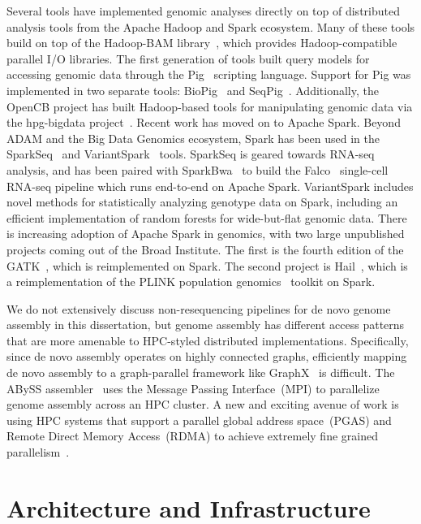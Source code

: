 \documentclass[phd]{ucbthesis}
\begin{document}
Several tools have implemented genomic analyses directly on top of distributed
analysis tools from the {Apache Hadoop} and {Spark} ecosystem.
Many of these tools build on top of the {Hadoop-BAM}
library~\cite{niemenmaa12}, which provides {Hadoop}-compatible parallel
I/O libraries. The first generation of tools built query models for accessing
genomic data through the {Pig}~\cite{olston08} scripting language.
Support for {Pig} was implemented in two separate tools: {BioPig}~\cite{nordberg13}
and {SeqPig}~\cite{schumacher14}. Additionally, the {OpenCB}
project has built {Hadoop}-based tools for manipulating genomic data via
the {hpg-bigdata} project~\cite{opencb}. Recent work has moved on to
{Apache Spark}. Beyond {ADAM} and the {Big Data Genomics}
ecosystem, {Spark} has been used in the
{SparkSeq}~\cite{wiewiorka14} and {VariantSpark}~\cite{obrien15}
tools. {SparkSeq} is geared towards RNA-seq analysis, and has been
paired with {SparkBwa}~\cite{abuin16} to build the
{Falco}~\cite{yang16} single-cell RNA-seq pipeline which runs end-to-end
on {Apache Spark}. {VariantSpark} includes novel methods for
statistically analyzing genotype data on {Spark}, including an efficient
implementation of random forests for wide-but-flat genomic data. There is
increasing adoption of {Apache Spark} in genomics, with two large
unpublished projects coming out of the Broad Institute. The first is the fourth
edition of the {GATK}~\cite{gatk4}, which is reimplemented on
{Spark}. The second project is {Hail}~\cite{hail}, which is a
reimplementation of the {PLINK} population genomics~\cite{purcell07}
toolkit on {Spark}.

We do not extensively discuss non-resequencing pipelines for de novo genome
assembly in this dissertation, but genome assembly has different access patterns
that are more amenable to HPC-styled distributed implementations. Specifically,
since de novo assembly operates on highly connected graphs, efficiently mapping
de novo assembly to a graph-parallel framework like
{GraphX}~\cite{gonzalez14} is difficult. The {ABySS}
assembler~\cite{simpson09} uses the Message Passing Interface~(MPI) to
parallelize genome assembly across an HPC cluster. A new and exciting avenue
of work is using HPC systems that support a parallel global address space~(PGAS)
and Remote Direct Memory Access~(RDMA) to achieve extremely fine grained
parallelism~\cite{georganas14, georganas15hipmer, georganas15meraligner,
  georganas17}.

\part{Architecture and Infrastructure}
\end{document}

